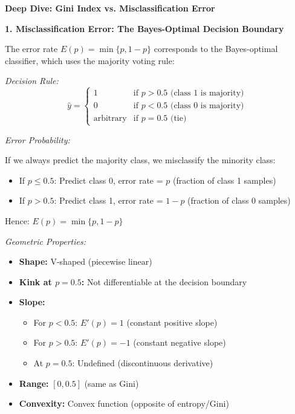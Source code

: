 \documentclass[12pt]{article}
\begin{document}
\begin{explanation}
\textbf{Deep Dive: Gini Index vs. Misclassification Error}

\textbf{1. Misclassification Error: The Bayes-Optimal Decision Boundary}

The error rate $E(p) = \min\{p, 1-p\}$ corresponds to the Bayes-optimal classifier, which uses the majority voting rule:

\textit{Decision Rule:}
\[
\hat{y} = \begin{cases}
1 & \text{if } p > 0.5 \text{ (class 1 is majority)} \\
0 & \text{if } p < 0.5 \text{ (class 0 is majority)} \\
\text{arbitrary} & \text{if } p = 0.5 \text{ (tie)}
\end{cases}
\]

\textit{Error Probability:}

If we always predict the majority class, we misclassify the minority class:
\begin{itemize}
    \item If $p \leq 0.5$: Predict class 0, error rate = $p$ (fraction of class 1 samples)
    \item If $p > 0.5$: Predict class 1, error rate = $1-p$ (fraction of class 0 samples)
\end{itemize}

Hence: $E(p) = \min\{p, 1-p\}$

\textit{Geometric Properties:}
\begin{itemize}
    \item \textbf{Shape:} V-shaped (piecewise linear)
    \item \textbf{Kink at $p=0.5$:} Not differentiable at the decision boundary
    \item \textbf{Slope:}
    \begin{itemize}
        \item For $p < 0.5$: $E'(p) = 1$ (constant positive slope)
        \item For $p > 0.5$: $E'(p) = -1$ (constant negative slope)
        \item At $p = 0.5$: Undefined (discontinuous derivative)
    \end{itemize}
    \item \textbf{Range:} $[0, 0.5]$ (same as Gini)
    \item \textbf{Convexity:} Convex function (opposite of entropy/Gini)
\end{itemize}


\end{explanation}
\end{document}
